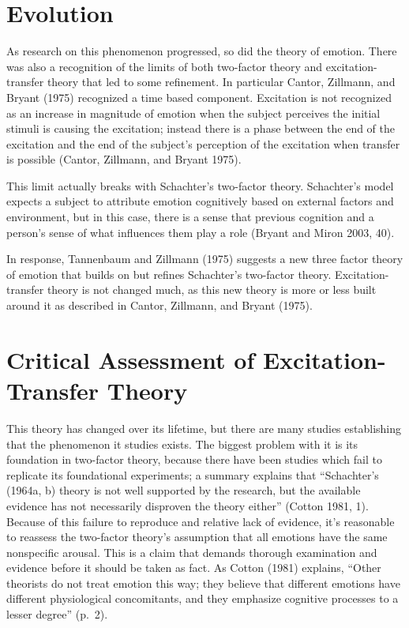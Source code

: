\hypertarget{evolution}{%
\section{Evolution}\label{evolution}}

As research on this phenomenon progressed, so did the theory of emotion.
There was also a recognition of the limits of both two-factor theory and
excitation-transfer theory that led to some refinement. In particular
{Cantor, Zillmann, and Bryant (1975)} recognized a time based component.
Excitation is not recognized as an increase in magnitude of emotion when
the subject perceives the initial stimuli is causing the excitation;
instead there is a phase between the end of the excitation and the end
of the subject's perception of the excitation when transfer is possible
{(Cantor, Zillmann, and Bryant 1975)}.

This limit actually breaks with Schachter's two-factor theory.
Schachter's model expects a subject to attribute emotion cognitively
based on external factors and environment, but in this case, there is a
sense that previous cognition and a person's sense of what influences
them play a role {(Bryant and Miron 2003, 40)}.

In response, {Tannenbaum and Zillmann (1975)} suggests a new three
factor theory of emotion that builds on but refines Schachter's
two-factor theory. Excitation-transfer theory is not changed much, as
this new theory is more or less built around it as described in {Cantor,
Zillmann, and Bryant (1975)}.

\hypertarget{critical-assessment-of-excitation-transfer-theory}{%
\section{Critical Assessment of Excitation-Transfer
Theory}\label{critical-assessment-of-excitation-transfer-theory}}

This theory has changed over its lifetime, but there are many studies
establishing that the phenomenon it studies exists. The biggest problem
with it is its foundation in two-factor theory, because there have been
studies which fail to replicate its foundational experiments; a summary
explains that ``Schachter's (1964a, b) theory is not well supported by
the research, but the available evidence has not necessarily disproven
the theory either'' {(Cotton 1981, 1)}. Because of this failure to
reproduce and relative lack of evidence, it's reasonable to reassess the
two-factor theory's assumption that all emotions have the same
nonspecific arousal. This is a claim that demands thorough examination
and evidence before it should be taken as fact. As {Cotton (1981)}
explains, ``Other theorists do not treat emotion this way; they believe
that different emotions have different physiological concomitants, and
they emphasize cognitive processes to a lesser degree'' (p.~2).

